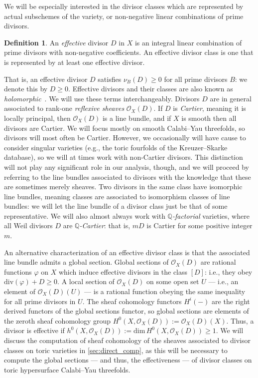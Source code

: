 \documentclass[11pt,dvipsnames]{article}
\theoremstyle{definition}
\newtheorem{definition}[theorem]{Definition}
\begin{document}
We will be especially interested in the divisor classes which are represented by actual subschemes of the variety, or non-negative linear combinations of prime divisors.
\begin{definition}\label{def:eff-comb}
    An \textit{effective} divisor $D$ in $X$ is an integral linear combination of prime divisors with non-negative coefficients. An effective divisor class is one that is represented by at least one effective divisor.
\end{definition}
That is, an effective divisor $D$ satisfies $\nu_B(D) \geq 0$ for all prime divisors $B$: we denote this by $D \geq 0$. Effective divisors and their classes are also known as \textit{holomorphic}~\cite{Witten:1996bn}. We will use these terms interchangeably. Divisors $D$ are in general associated to rank-one \textit{reflexive sheaves} $\mathcal{O}_X(D)$. If $D$ is \textit{Cartier}, meaning it is locally principal, then $\mathcal{O}_X(D)$ is a line bundle, and if $X$ is smooth then all divisors are Cartier. We will focus mostly on smooth Calabi--Yau threefolds, so divisors will most often be Cartier. However, we occasionally will have cause to consider singular varieties (e.g., the toric fourfolds of the Kreuzer--Skarke database), so we will at times work with non-Cartier divisors. This distinction will not play any significant role in our analysis, though, and we will proceed by referring to the line bundles associated to divisors with the knowledge that these are sometimes merely sheaves. Two divisors in the same class have isomorphic line bundles, meaning classes are associated to isomorphism classes of line bundles: we will let the line bundle of a divisor class just be that of some representative. We will also almost always work with \textit{$\mathbb{Q}$-factorial} varieties, where all Weil divisors $D$ are \textit{$\mathbb{Q}$-Cartier}: that is, $mD$ is Cartier for some positive integer $m$.

An alternative characterization of an effective divisor class is that the associated line bundle admits a global section. Global sections of $\mathcal{O}_X(D)$ are rational functions $\varphi$ on $X$ which induce effective divisors in the class $[D]$: i.e., they obey $\mathrm{div}(\varphi) + D \geq 0$. A local section of $\mathcal{O}_X(D)$ on some open set $U$ --- i.e., an element of $\mathcal{O}_X(D)(U)$ --- is a rational function obeying the same inequality for all prime divisors in $U$. The sheaf cohomology functors $H^i(-)$ are the right derived functors of the global sections functor, so global sections are elements of the zeroth sheaf cohomology group $H^0(X,\mathcal{O}_X(D)) := \mathcal{O}_X(D)(X)$. Thus, a divisor is effective if $h^0(X,\mathcal{O}_X(D)) := \mathrm{dim} \, H^0(X,\mathcal{O}_X(D)) \geq 1$. We will discuss the computation of sheaf cohomology of the sheaves associated to divisor classes on toric varieties in \cref{sec:direct_comp}, as this will be necessary to compute the global sections --- and thus, the effectiveness --- of divisor classes on toric hypersurface Calabi--Yau threefolds.
\end{document}
